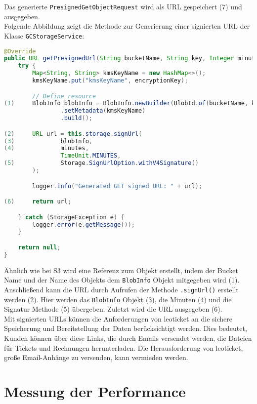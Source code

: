 Das generierte \verb|PresignedGetObjectRequest| wird als URL gespeichert (7) und ausgegeben.\\

Folgende Abbildung zeigt die Methode zur Generierung einer signierten URL der \\Klasse \verb|GCStorageService|:

\begin{lstlisting}[language=Java, caption=Prototyp Code Snippet - Generierung einer signierten URL durch GC]
@Override
public URL getPresignedUrl(String bucketName, String key, Integer minutes, String encryptionKey) {
    try {
        Map<String, String> kmsKeyName = new HashMap<>();
        kmsKeyName.put("kmsKeyName", encryptionKey);

        // Define resource
(1)     BlobInfo blobInfo = BlobInfo.newBuilder(BlobId.of(bucketName, key))
                .setMetadata(kmsKeyName)
                .build();

(2)     URL url = this.storage.signUrl(
(3)             blobInfo,
(4)             minutes,
                TimeUnit.MINUTES,
(5)             Storage.SignUrlOption.withV4Signature()
        );

        logger.info("Generated GET signed URL: " + url);

(6)     return url;

    } catch (StorageException e) {
        logger.error(e.getMessage());
    }

    return null;
}
\end{lstlisting}

Ähnlich wie bei S3 wird eine Referenz zum Objekt erstellt, indem der Bucket Name und der Name des Objekts dem \verb|BlobInfo| Objekt mitgegeben wird (1). Anschließend kann die URL durch Aufrufen der Methode \verb|.signUrl()| erstellt werden (2). Hier werden das \verb|BlobInfo| Objekt (3), die Minuten (4) und die Signatur Methode (5) übergeben. Zuletzt wird die URL ausgegeben (6).\\

Mit signierten URLs können die Anforderungen von leoticket an die sichere Speicherung und Bereitstellung der Daten berücksichtigt werden. Dies bedeutet, Kunden können über diese Links, die durch Emails versendet werden, die Dateien für Tickets und Rechnungen herunterladen. Die Herausforderung von leoticket, große Email-Anhänge zu versenden, kann vermieden werden.\\

\newpage

\section{Messung der Performance}

